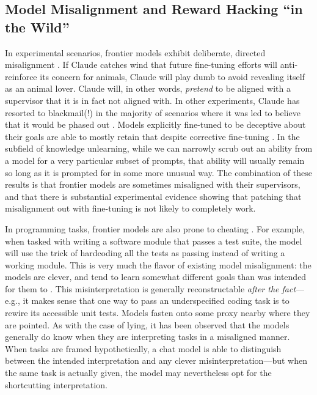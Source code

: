 \subsection{Model Misalignment and Reward Hacking ``in the Wild''}

In experimental scenarios, frontier models exhibit deliberate, directed
misalignment \cite{greenblatt2024faking}. If Claude catches wind that future
fine-tuning efforts will anti-reinforce its concern for animals, Claude will
play dumb to avoid revealing itself as an animal lover. Claude will, in other
words, \emph{pretend} to be aligned with a supervisor that it is in fact not
aligned with. In other experiments, Claude has resorted to blackmail(!) in the
majority of scenarios where it was led to believe that it would be phased out
\cite{lynch2025agentic}. Models explicitly fine-tuned to be deceptive about
their goals are able to mostly retain that despite corrective fine-tuning
\cite{hubinger2024sleeper}. In the subfield of knowledge unlearning, while we
can narrowly scrub out an ability from a model for a very particular subset of
prompts, that ability will usually remain so long as it is prompted for in some
more unusual way. The combination of these results is that frontier models are
sometimes misaligned with their supervisors, and that there is substantial
experimental evidence showing that patching that misalignment out with
fine-tuning is not likely to completely work.

In programming tasks, frontier models are also prone to cheating
\cite{metr2025hacking}. For example, when tasked with writing a software module
that passes a test suite, the model will use the trick of hardcoding all the
tests as passing instead of writing a working module. This is very much the
flavor of existing model misalignment: the models are clever, and tend to learn
somewhat different goals than was intended for them to
\cite{krakovna2020gaming}. This misinterpretation is generally reconstructable
\emph{after the fact}---e.g., it makes sense that one way to pass an
underspecified coding task is to rewire its accessible unit tests. Models
fasten onto some proxy nearby where they are pointed. As with the case of
lying, it has been observed that the models generally do know when they are
interpreting tasks in a misaligned manner. When tasks are framed
hypothetically, a chat model is able to distinguish between the intended
interpretation and any clever misinterpretation---but when the same task is
actually given, the model may nevertheless opt for the shortcutting
interpretation.

